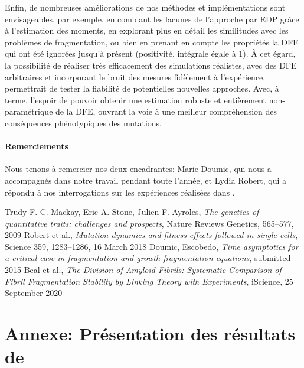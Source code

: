 \documentclass[12pt]{article}
\newcounter{prop}[section]
\begin{document}
  Enfin, de nombreuses améliorations de nos méthodes et implémentations sont envisageables, par exemple, en comblant les lacunes de l'approche par EDP grâce à l'estimation des moments, en explorant plus en détail les similitudes avec les problèmes de fragmentation, ou bien en prenant en compte les propriétés la DFE qui ont été ignorées jusqu'à présent (positivité, intégrale égale à $1$). À cet égard, la possibilité de réaliser très efficacement des simulations réalistes, avec des DFE arbitraires et incorporant le bruit des mesures fidèlement à l'expérience, permettrait de tester la fiabilité de potentielles nouvelles approches. Avec, à terme, l'espoir de pouvoir obtenir une estimation robuste et entièrement non-paramétrique de la DFE, ouvrant la voie à une meilleur compréhension des conséquences phénotypiques des mutations.

  \paragraph{Remerciements}

  Nous tenons à remercier nos deux encadrantes: Marie Doumic, qui nous a accompagnés dans notre travail pendant toute l'année, et Lydia Robert, qui a répondu à nos interrogations sur les expériences réalisées dans \cite{rob}.
  
\newpage

\begin{thebibliography}{1}

  Trudy F. C. Mackay, Eric A. Stone, Julien F. Ayroles,
  \emph{The genetics of quantitative traits: challenges and prospects}, Nature Reviews Genetics, 565–577, 2009
  Robert et al.,
  \emph{Mutation dynamics and fitness effects followed in single cells}, Science 359, 1283–1286, 16 March 2018
  Doumic, Escobedo,
  \emph{Time asymptotics for a critical case in fragmentation and growth-fragmentation equations}, submitted 2015
  Beal et al.,
  \emph{The Division of Amyloid Fibrils: Systematic Comparison of Fibril Fragmentation Stability by Linking Theory with Experiments}, iScience, 25 September 2020
\end{thebibliography}





\newpage

\appendix

\FloatBarrier
\section{Annexe: Présentation des résultats de \cite{rob}}\label{ann:resultats}
\end{document}
